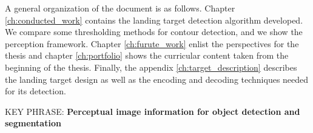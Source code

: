 A general organization of the document is as follows. Chapter \ref{ch:conducted_work} contains the landing target detection algorithm developed. We compare some thresholding methods for contour detection, and we show the perception framework. Chapter \ref{ch:furute_work} enlist the perspectives for the thesis and chapter \ref{ch:portfolio} shows the curricular content taken from the beginning of the thesis. Finally, the appendix \ref{ch:target_description} describes the landing target design as well as the encoding and decoding techniques needed for its detection.

KEY PHRASE: \textbf{Perceptual image information for object detection and segmentation}




